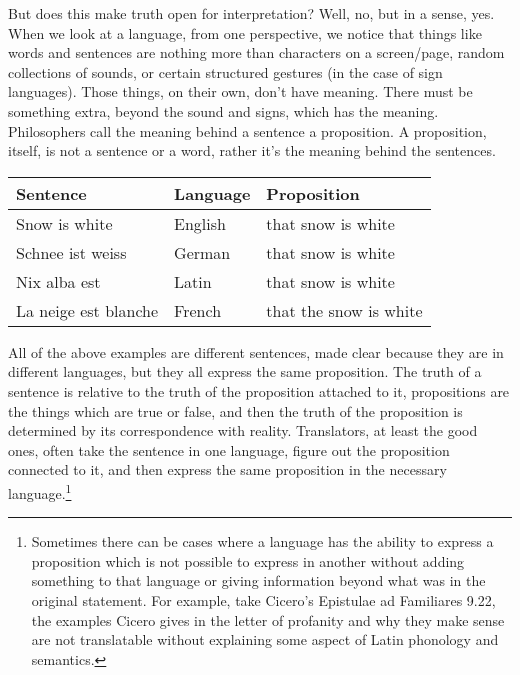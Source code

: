 But does this make truth open for interpretation? Well, no, but in a sense, yes. When we look at a language, from one perspective, we notice that things like words and sentences are nothing more than characters on a screen/page, random collections of sounds, or certain structured gestures (in the case of sign languages). Those things, on their own, don't have meaning. There must be something extra, beyond the sound and signs, which has the meaning.  Philosophers call the meaning behind a sentence a proposition. A proposition, itself, is not a sentence or a word, rather it's the meaning behind the sentences.


\begin{center}
\begin{tabular}{p{2in}|p{1.5in}|p{2in}}\hline
Sentence &Language &Proposition\\\hline
Snow is white &English &that snow is white\\\hline
Schnee ist weiss &German &that snow is white\\\hline
Nix alba est &Latin &that snow is white\\\hline
La neige est blanche &French &that the snow is white\\\hline
\end{tabular}
\end{center}

All of the above examples are different sentences, made clear because they are in different languages, but they all express the same proposition. The truth of a sentence is relative to the truth of the proposition attached to it, propositions are the things which are true or false, and then the truth of the proposition is determined by its correspondence with reality. Translators, at least the good ones, often take the sentence in one language, figure out the proposition connected to it, and then express the same proposition in the necessary language.\footnote{Sometimes there can be cases where a language has the ability to express a proposition which is not possible to express in another without adding something to that language or giving information beyond what was in the original statement. For example, take Cicero's Epistulae ad Familiares 9.22, the examples Cicero gives in the letter of profanity and why they make sense are  not translatable without explaining some aspect of Latin phonology and semantics.}

